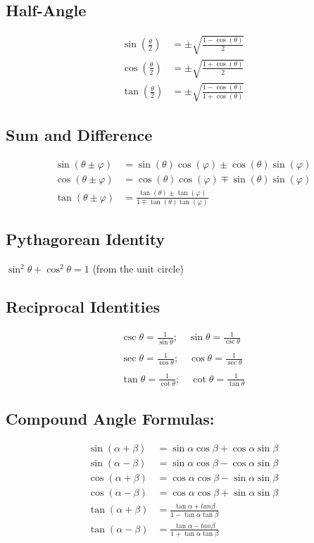 \documentclass{article}
\begin{document}
\subsection*{Half-Angle}
  \begin{align*}
    \sin(\tfrac{\theta}{2}) &= \pm\sqrt{\tfrac{1-\cos(\theta)}{2}} \\
    \cos(\tfrac{\theta}{2}) &= \pm\sqrt{\tfrac{1+\cos(\theta)}{2}} \\
    \tan(\tfrac{\theta}{2}) &= \pm\sqrt{\tfrac{1-\cos(\theta)}{1+\cos(\theta)}}
  \end{align*}
\subsection*{Sum and Difference}
\begin{align*}
\sin (\theta \pm \varphi) &= \sin(\theta)\cos(\varphi) \pm \cos(\theta)\sin(\varphi) \\
\cos (\theta \pm \varphi) &= \cos(\theta)\cos(\varphi) \mp \sin(\theta)\sin(\varphi) \\
\tan (\theta \pm \varphi) &= \frac{\tan(\theta) \pm \tan(\varphi)}{1 \mp \tan(\theta)\tan(\varphi)}
\end{align*}

\subsection*{Pythagorean Identity} $\sin ^2 \theta+\cos ^2 \theta=1$ (from the unit circle)

\subsection*{Reciprocal Identities }
$$
\begin{array}{ll}
\csc \theta=\frac{1}{\sin \theta} ; \quad \sin \theta=\frac{1}{\csc \theta} \\\\
\sec \theta=\frac{1}{\cos \theta} ; \quad \cos \theta=\frac{1}{\sec \theta} \\\\
\tan \theta=\frac{1}{\cot \theta} ; \quad \cot \theta=\frac{1}{\tan \theta}
\end{array}
$$

\subsection*{Compound Angle Formulas:}
$$
\begin{aligned}
\sin (\alpha+\beta) & =\sin \alpha \cos \beta+\cos \alpha \sin \beta \\
\sin (\alpha-\beta) & =\sin \alpha \cos \beta-\cos \alpha \sin \beta \\
\cos (\alpha+\beta) & =\cos \alpha \cos \beta-\sin \alpha \sin \beta \\
\cos (\alpha-\beta) & =\cos \alpha \cos \beta+\sin \alpha \sin \beta\\
\tan (\alpha+\beta)&=\frac{\tan \alpha+tan \beta}{1-\tan \alpha\tan\beta}\\
\tan (\alpha-\beta)&=\frac{\tan \alpha-tan \beta}{1+\tan \alpha\tan\beta}
\end{aligned}
$$
\end{document}
